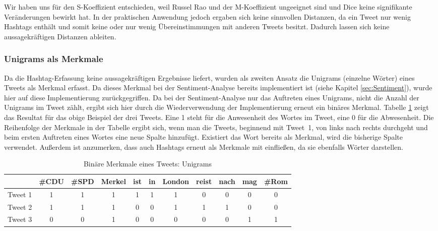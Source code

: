 Wir haben uns für den S-Koeffizient entschieden, weil Russel Rao und der M-Koeffizient ungeeignet sind und Dice keine signifikante Veränderungen bewirkt hat.
In der praktischen Anwendung jedoch ergaben sich keine sinnvollen Distanzen, da ein Tweet nur wenig Hash\-tags enthält 
und somit keine oder nur wenig Übereinstimmungen mit anderen Tweets besitzt. 
Dadurch lassen sich keine aussagekräftigen Distanzen ableiten.

\subsubsection{Unigrams als Merkmale}\label{subsec:WoerterAlsMerkmale}
Da die Hashtag-Erfassung keine aussagekräftigen Ergebnisse liefert, wurden als zweiten Ansatz die Unigrams (einzelne Wörter) eines Tweets als Merkmal erfasst. Da dieses Merkmal bei der Sentiment-Analyse bereits implementiert ist (siehe Kapitel \ref{sec:Sentiment}), wurde hier auf diese Implementierung zurückgegriffen. Da bei der Sentiment-Analyse nur das Auftreten eines Unigrams, nicht die Anzahl der Unigrams im Tweet zählt, ergibt sich hier durch die Wiederverwendung der Implementierung erneut ein binäres Merkmal. Tabelle \ref{fig:ClusterTab2} zeigt das Resultat für das obige Beispiel der drei Tweets. Eine 1 steht für die Anwesenheit des Wortes im Tweet, eine 0 für die Abwesenheit.
Die Reihenfolge der Merkmale in der Tabelle ergibt sich, wenn man die Tweets, beginnend mit Tweet~1, von links nach rechts durchgeht und beim ersten Auftreten eines Wortes eine neue Spalte hinzufügt. Exis\-tiert das Wort bereits als Merkmal, wird die bisherige Spalte verwendet. 
Außerdem ist anzumerken, dass auch Hashtags erneut als Merkmale mit einfließen, da sie ebenfalls Wörter darstellen.

\begin{table}[ht]
\centering
\small
\begin{tabular}{ccccccccccc}
\toprule
 & \#CDU & \#SPD & Merkel & ist & in & London & reist & nach & mag & \#Rom \\ 
\midrule
Tweet 1 & 1  & 1 & 1 & 1 & 1 & 1 & 0 & 0 & 0 & 0 \\ 
 
Tweet 2 & 1  & 1 & 1 & 0 & 0 & 1 & 1 & 1 & 0 & 0\\ 

Tweet 3 & 0  & 0 & 1 & 0 & 0 & 0 & 0 & 0 & 1 & 1 \\ 
\bottomrule
\end{tabular} 
\caption{Binäre Merkmale eines Tweets: Unigrams}
\label{fig:ClusterTab2}
\end{table}

